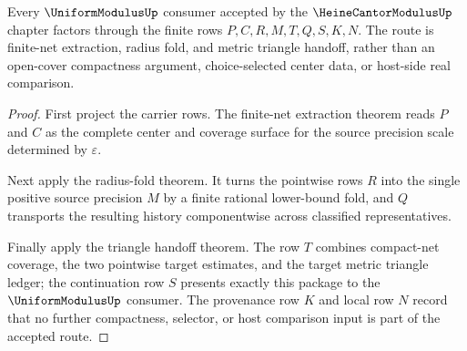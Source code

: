 \begin{theorem}
\label{thm:heine-cantor-modulus-uniformmodulus-export}
Every $\UniformModulusUp$ consumer accepted by the
$\HeineCantorModulusUp$ chapter factors through the finite rows
$P,C,R,M,T,Q,S,K,N$. The route is finite-net extraction, radius fold, and
metric triangle handoff, rather than an open-cover compactness argument,
choice-selected center data, or host-side real comparison.
\end{theorem}
\begin{proof}
First project the carrier rows. The finite-net extraction theorem reads
$P$ and $C$ as the complete center and coverage surface for the source
precision scale determined by $\varepsilon$.

Next apply the radius-fold theorem. It turns the pointwise rows $R$ into the
single positive source precision $M$ by a finite rational lower-bound fold, and
$Q$ transports the resulting history componentwise across classified
representatives.

Finally apply the triangle handoff theorem. The row $T$ combines compact-net
coverage, the two pointwise target estimates, and the target metric triangle
ledger; the continuation row $S$ presents exactly this package to the
$\UniformModulusUp$ consumer. The provenance row $K$ and local row $N$ record
that no further compactness, selector, or host comparison input is part of the
accepted route.
\end{proof}

